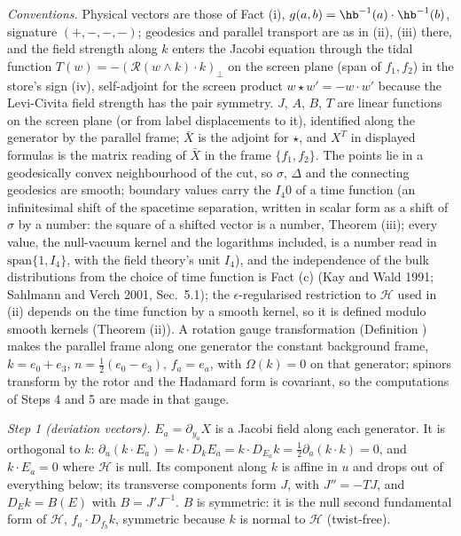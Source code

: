 \emph{Conventions.} Physical vectors are those of Fact (i), $g(a, b) = \hb^{-1}(a)\cdot\hb^{-1}(b)$, signature $(+,-,-,-)$; geodesics and parallel transport are as in (ii), (iii) there, and the field strength along $k$ enters the Jacobi equation through the tidal function $T(w) = -(\mathcal{R}(w\wedge k)\cdot k)_{\perp}$ on the screen plane (span of $f_{1}, f_{2}$) in the store's sign (iv), self-adjoint for the screen product $w\star w' = -w\cdot w'$ because the Levi-Civita field strength has the pair symmetry. $J$, $A$, $B$, $T$ are linear functions on the screen plane (or from label displacements to it), identified along the generator by the parallel frame; $\bar X$ is the adjoint for $\star$, and $X^{T}$ in displayed formulas is the matrix reading of $\bar X$ in the frame $\{f_{1}, f_{2}\}$. The points lie in a geodesically convex neighbourhood of the cut, so $\sigma$, $\Delta$ and the connecting geodesics are smooth; boundary values carry the $I_{4}0$ of a time function (an infinitesimal shift of the spacetime separation, written in scalar form as a shift of $\sigma$ by a number: the square of a shifted vector is a number, Theorem (iii); every value, the null-vacuum kernel and the logarithms included, is a number read in $\mathrm{span}\{1, I_{4}\}$, with the field theory's unit $I_{4}$), and the independence of the bulk distributions from the choice of time function is Fact (c) (Kay and Wald 1991; Sahlmann and Verch 2001, Sec.~5.1); the $\epsilon$-regularised restriction to $\mathcal{H}$ used in (ii) depends on the time function by a smooth kernel, so it is defined modulo smooth kernels (Theorem (ii)). A rotation gauge transformation (Definition ) makes the parallel frame along one generator the constant background frame, $k = e_{0} + e_{3}$, $n = \tfrac12(e_{0} - e_{3})$, $f_{a} = e_{a}$, with $\Omega(k) = 0$ on that generator; spinors transform by the rotor and the Hadamard form is covariant, so the computations of Steps 4 and 5 are made in that gauge.

\emph{Step 1 (deviation vectors).} $E_{a} = \partial_{y_{a}}X$ is a Jacobi field along each generator. It is orthogonal to $k$: $\partial_{u}(k\cdot E_{a}) = k\cdot D_{k}E_{a} = k\cdot D_{E_{a}}k = \tfrac12\partial_{a}(k\cdot k) = 0$, and $k\cdot E_{a} = 0$ where $\mathcal{H}$ is null. Its component along $k$ is affine in $u$ and drops out of everything below; its transverse components form $J$, with $J'' = -TJ$, and $D_{E}k = B(E)$ with $B = J'J^{-1}$. $B$ is symmetric: it is the null second fundamental form of $\mathcal{H}$, $f_{a}\cdot D_{f_{b}}k$, symmetric because $k$ is normal to $\mathcal{H}$ (twist-free).

